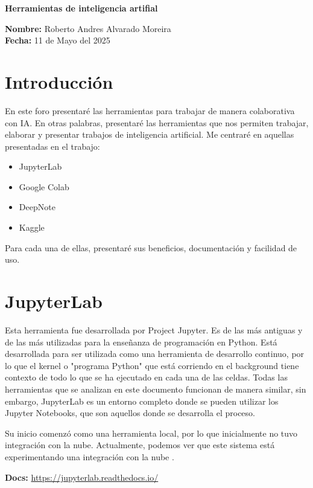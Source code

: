 \documentclass[a4paper,12pt]{article}
\begin{document}
\begin{center}
    \Large \textbf{Herramientas de inteligencia artifial}
\end{center}

\noindent\textbf{Nombre:} Roberto Andres Alvarado Moreira \\
\noindent\textbf{Fecha:} 11 de Mayo del 2025
\section{Introducción}
En este foro presentaré las herramientas para trabajar de manera colaborativa con IA. En otras palabras, presentaré las herramientas que nos permiten trabajar, elaborar y presentar trabajos de inteligencia artificial. Me centraré en aquellas presentadas en el trabajo:
\begin{itemize}
    \item JupyterLab
    \item Google Colab
    \item DeepNote
    \item Kaggle
\end{itemize}
Para cada una de ellas, presentaré sus beneficios, documentación y facilidad de uso.

\section{JupyterLab}
Esta herramienta fue desarrollada por Project Jupyter. Es de las más antiguas y de las más utilizadas para la enseñanza de programación en Python. Está desarrollada para ser utilizada como una herramienta de desarrollo continuo, por lo que el kernel o "programa Python" que está corriendo en el background tiene contexto de todo lo que se ha ejecutado en cada una de las celdas. Todas las herramientas que se analizan en este documento funcionan de manera similar, sin embargo, JupyterLab es un entorno completo donde se pueden utilizar los Jupyter Notebooks, que son aquellos donde se desarrolla el proceso. \cite{jupyterlab_docs}

Su inicio comenzó como una herramienta local, por lo que inicialmente no tuvo integración con la nube. Actualmente, podemos ver que este sistema está experimentando una integración con la nube \cite{jupyter2024}.

\textbf{Docs:} \url{https://jupyterlab.readthedocs.io/}\cite{jupyterlab_docs}
\end{document}
